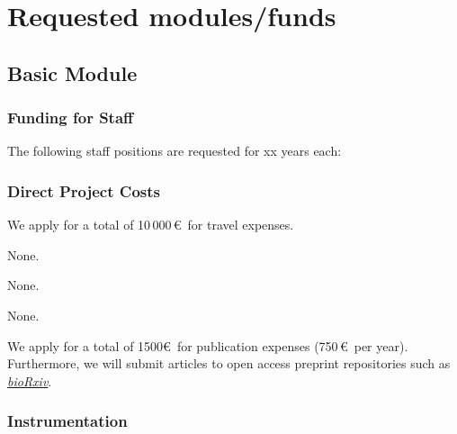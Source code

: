 \documentclass{scrartcl}
\begin{document}
\section{Requested modules/funds}

\subsection{Basic Module}

\subsubsection{Funding for Staff}
\begin{funds}
	The following staff positions are requested for xx years each:

\end{funds}

\subsubsection{Direct Project Costs}
\begin{funds}



	We apply for a total of 10\,000\,\euro\ for travel expenses.

	None.

	None.

	None.

	We apply for a total of 1500\euro\ for publication expenses (750\,\euro\ per
	year). Furthermore, we will submit articles to open access preprint repositories
	such as \href{https://www.biorxiv.org/}{\textit{bioRxiv}}.

\end{funds}

\subsubsection{Instrumentation}
\end{document}

